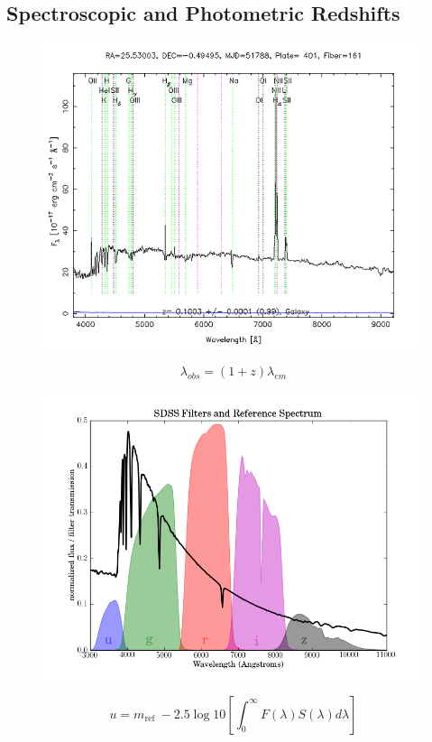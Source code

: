 \documentclass{beamer}
\begin{document}
\subsection{Spectroscopic and Photometric Redshifts}
\begin{frame}
    \begin{figure}
        \includegraphics[scale=0.35]{img/galaxy_spectrum.png}
    \end{figure}
    \begin{equation}
        \lambda_{obs} = (1+z)\lambda_{em}
    \end{equation}
    \end{frame}
\begin{frame}
    \begin{figure}
        \includegraphics[scale=0.25]{img/sdss_plot.png}
    \end{figure}
    \begin{equation}
        u=m_{\text {ref }}-2.5 \log {10}\left[\int_{0}^{\infty} F(\lambda) S(\lambda) d \lambda\right]
    \end{equation}
    \end{frame}
\end{document}
